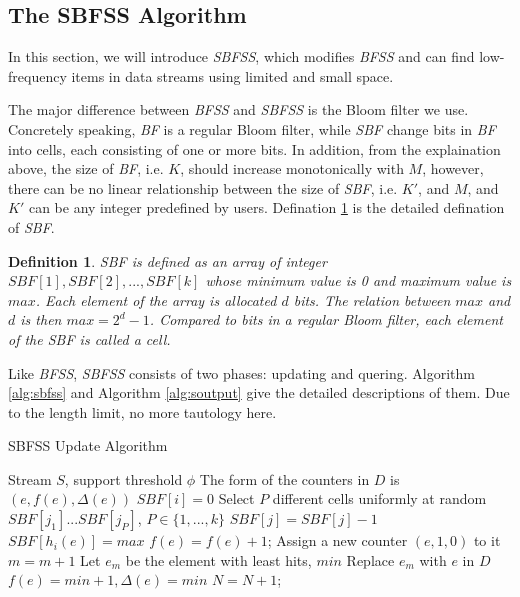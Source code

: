 \documentclass[conference]{IEEEtran}
\begin{document}
\subsection{The SBFSS Algorithm}\label{sec:sbfss}
In this section, we will introduce \emph{SBFSS}, which modifies \emph{BFSS} and can find low-frequency items in data streams using limited and small space.\par
The major difference between \emph{BFSS} and \emph{SBFSS} is the Bloom filter we use. Concretely speaking, \emph{BF} is a regular Bloom filter, while \emph{SBF} change bits in \emph{BF} into cells, each consisting of one or more bits. In addition, from the explaination above, the size of \emph{BF}, i.e. $K$, should increase monotonically with $M$, however, there can be no linear relationship between the size of \emph{SBF}, i.e. $K'$, and $M$, and $K'$ can be any integer predefined by users. Defination \ref{def:1} is the detailed defination of \emph{SBF}.\par  

\newtheorem{defn}{Definition}
\begin{defn}\label{def:1}
\emph{SBF} is defined as an array of integer $SBF[1],SBF[2],...,SBF[k]$ whose minimum value is 0 and maximum value is $max$. Each element of the array is allocated $d$ bits. The relation between $max$ and $d$ is then $max=2^d-1$. Compared to bits in a regular Bloom ﬁlter, each element of the \emph{SBF} is called a cell.
\end{defn}

Like \emph{BFSS}, \emph{SBFSS} consists of two phases: updating and quering. Algorithm \ref{alg:sbfss} and Algorithm \ref{alg:soutput} give the detailed descriptions of them. Due to the length limit, no more tautology here.


\begin{algorithm}[h]
	\caption{SBFSS Update Algorithm}
	\label{alg:sbfss}
	\begin{algorithmic}[1]
		\REQUIRE Stream $S$, support threshold $\phi$
		\STATE The form of the counters in $D$ is $(e,f(e),\Delta(e))$
		\STATE $SBF[i]=0$
		\ENDFOR
		\STATE Select $P$ different cells uniformly at random $SBF[j_1]...SBF[j_P]$, $P\in \{1,...,k\}$
		\STATE $SBF[j]=SBF[j]-1$
		\ENDIF
		\ENDFOR
		\STATE $SBF[h_i(e)]=max$
		\ENDFOR
		\STATE $f(e)=f(e)+1$;
		\STATE Assign a new counter $(e,1,0)$ to it
		\STATE $m=m+1$
		\ELSE
		\STATE Let $e_m$ be the element with least hits, $min$
		\STATE Replace $e_m$ with $e$ in $D$
		\STATE $f(e)=min+1,\Delta(e)=min$
		\ENDIF
		\STATE $N=N+1$;
		\ENDFOR
	\end{algorithmic}
\end{algorithm}
\end{document}
